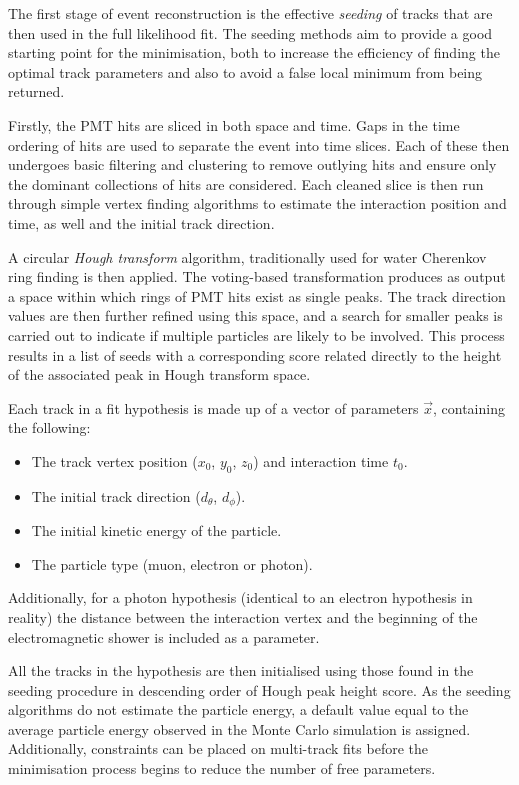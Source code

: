 The first stage of event reconstruction is the effective \emph{seeding} of tracks that are then
used in the full likelihood fit. The seeding methods aim to provide a good starting point for the
minimisation, both to increase the efficiency of finding the optimal track parameters and also to
avoid a false local minimum from being returned.

Firstly, the PMT hits are sliced in both space and time. Gaps in the time ordering of hits are
used to separate the event into time slices. Each of these then undergoes basic filtering and
clustering to remove outlying hits and ensure only the dominant collections of hits are
considered. Each cleaned slice is then run through simple vertex finding algorithms to estimate
the interaction position and time, as well and the initial track direction.

A circular \emph{Hough transform} algorithm, traditionally used for water Cherenkov ring finding
is then applied. The voting-based transformation produces as output a space within which rings of
PMT hits exist as single peaks. The track direction values are then further refined using this
space, and a search for smaller peaks is carried out to indicate if multiple particles are likely
to be involved. This process results in a list of seeds with a corresponding score related
directly to the height of the associated peak in Hough transform space.

Each track in a fit hypothesis is made up of a vector of parameters $\vec{x}$, containing the
following:
\begin{itemize}
    \item The track vertex position ($x_{0}$, $y_{0}$, $z_{0}$) and interaction time $t_{0}$.
    \item The initial track direction ($d_{\theta}$, $d_{\phi}$).
    \item The initial kinetic energy of the particle.
    \item The particle type (muon, electron or photon).
\end{itemize}
Additionally, for a photon hypothesis (identical to an electron hypothesis in reality) the
distance between the interaction vertex and the beginning of the electromagnetic shower is
included as a parameter.

All the tracks in the hypothesis are then initialised using those found in the seeding procedure
in descending order of Hough peak height score. As the seeding algorithms do not estimate the
particle energy, a default value equal to the average particle energy observed in the Monte Carlo
simulation is assigned. Additionally, constraints can be placed on multi-track fits before the
minimisation process begins to reduce the number of free parameters.

